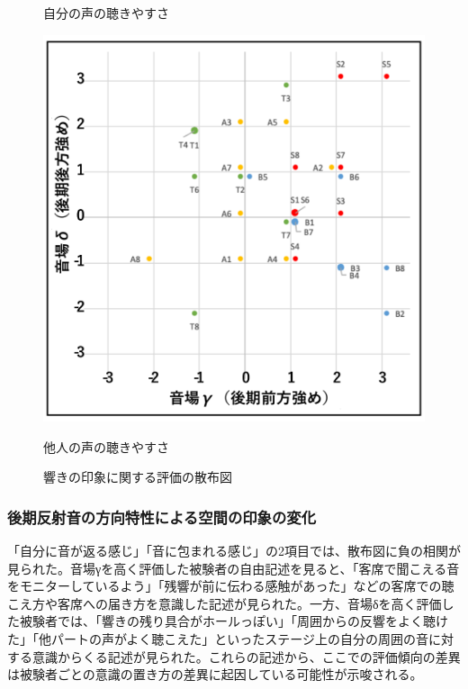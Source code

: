 \documentclass[11pt,a4j]{jreport}
\begin{document}
\begin{figure}[H]
\begin{minipage}{0.5\linewidth}
    \caption*{自分の声の聴きやすさ}
  \end{minipage}

  \begin{minipage}{1\linewidth}
    \centering
    \includegraphics[width=.45\linewidth]{images/subjectiveExp/scat_late_03othersVoice.pdf}
    \caption*{他人の声の聴きやすさ}
  \end{minipage}
  \caption{響きの印象に関する評価の散布図}
  \label{fig:響きの印象に関する評価の散布図}
\end{figure}


\newpage
\subsubsection*{後期反射音の方向特性による空間の印象の変化}
「自分に音が返る感じ」「音に包まれる感じ」の2項目では、散布図に負の相関が見られた。音場γを高く評価した被験者の自由記述を見ると、「客席で聞こえる音をモニターしているよう」「残響が前に伝わる感触があった」などの客席での聴こえ方や客席への届き方を意識した記述が見られた。一方、音場δを高く評価した被験者では、「響きの残り具合がホールっぽい」「周囲からの反響をよく聴けた」「他パートの声がよく聴こえた」といったステージ上の自分の周囲の音に対する意識からくる記述が見られた。これらの記述から、ここでの評価傾向の差異は被験者ごとの意識の置き方の差異に起因している可能性が示唆される。

\end{document}
